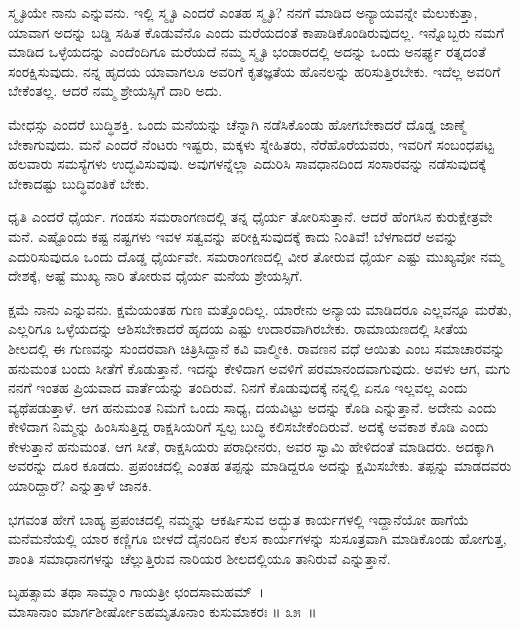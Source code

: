 ಸ್ಮೃತಿಯೇ ನಾನು ಎನ್ನುವನು. ಇಲ್ಲಿ ಸ್ಮೃತಿ ಎಂದರೆ ಎಂತಹ ಸ್ಮೃತಿ? ನನಗೆ ಮಾಡಿದ ಅನ್ಯಾಯವನ್ನೇ ಮೆಲುಕುತ್ತಾ, ಯಾವಾಗ ಅದನ್ನು ಬಡ್ಡಿ ಸಹಿತ ಕೊಡುವೆನೊ ಎಂದು ಮರೆಯದಂತೆ ಕಾಪಾಡಿಕೊಂಡಿರುವುದಲ್ಲ. ಇನ್ನೊಬ್ಬರು ನಮಗೆ ಮಾಡಿದ ಒಳ್ಳೆಯದನ್ನು ಎಂದೆಂದಿಗೂ ಮರೆಯದೆ ನಮ್ಮ ಸ್ಮೃತಿ ಭಂಡಾರದಲ್ಲಿ ಅದನ್ನು ಒಂದು ಅನರ್ಘ್ಯ ರತ್ನದಂತೆ ಸಂರಕ್ಷಿಸುವುದು. ನನ್ನ ಹೃದಯ ಯಾವಾಗಲೂ ಅವರಿಗೆ ಕೃತಜ್ಞತೆಯ ಹೊನಲನ್ನು ಹರಿಸುತ್ತಿರಬೇಕು. ಇದೆಲ್ಲ ಅವರಿಗೆ ಬೇಕೆಂತಲ್ಲ. ಆದರೆ ನಮ್ಮ ಶ್ರೇಯಸ್ಸಿಗೆ ದಾರಿ ಅದು.

ಮೇಧಸ್ಸು ಎಂದರೆ ಬುದ್ಧಿಶಕ್ತಿ. ಒಂದು ಮನೆಯನ್ನು ಚೆನ್ನಾಗಿ ನಡೆಸಿಕೊಂಡು ಹೋಗ\-ಬೇಕಾದರೆ ದೊಡ್ಡ ಜಾಣ್ಮೆ ಬೇಕಾಗುವುದು. ಮನೆ ಎಂದರೆ ನೆಂಟರು ಇಷ್ಟರು, ಮಕ್ಕಳು ಸ್ನೇಹಿತರು, ನೆರೆಹೊರೆಯವರು, ಇವರಿಗೆ ಸಂಬಂಧಪಟ್ಟ ಹಲವಾರು ಸಮಸ್ಯೆಗಳು ಉದ್ಭವಿಸುವುವು. ಅವು\-ಗಳನ್ನೆಲ್ಲಾ ಎದುರಿಸಿ ಸಾವಧಾನದಿಂದ ಸಂಸಾರವನ್ನು ನಡೆಸುವುದಕ್ಕೆ ಬೇಕಾದಷ್ಟು ಬುದ್ಧಿವಂತಿಕೆ ಬೇಕು.

\newpage

ಧೃತಿ ಎಂದರೆ ಧೈರ್ಯ. ಗಂಡಸು ಸಮರಾಂಗಣದಲ್ಲಿ ತನ್ನ ಧೈರ್ಯ ತೋರಿಸುತ್ತಾನೆ. ಆದರೆ ಹೆಂಗಸಿನ ಕುರುಕ್ಷೇತ್ರವೇ ಮನೆ. ಎಷ್ಟೊಂದು ಕಷ್ಟ ನಷ್ಟಗಳು ಇವಳ ಸತ್ವವನ್ನು ಪರೀಕ್ಷಿಸುವುದಕ್ಕೆ ಕಾದು ನಿಂತಿವೆ! ಬೆಳಗಾದರೆ ಅವನ್ನು ಎದುರಿಸುವುದೂ ಒಂದು ದೊಡ್ಡ ಧೈರ್ಯವೇ. ಸಮರಾಂಗಣದಲ್ಲಿ ವೀರ ತೋರುವ ಧೈರ್ಯ ಎಷ್ಟು ಮುಖ್ಯವೋ ನಮ್ಮ ದೇಶಕ್ಕೆ, ಅಷ್ಟೆ ಮುಖ್ಯ ನಾರಿ ತೋರುವ ಧೈರ್ಯ ಮನೆಯ ಶ್ರೇಯಸ್ಸಿಗೆ. 

ಕ್ಷಮೆ ನಾನು ಎನ್ನುವನು. ಕ್ಷಮೆಯಂತಹ ಗುಣ ಮತ್ತೊಂದಿಲ್ಲ. ಯಾರೇನು ಅನ್ಯಾಯ ಮಾಡಿದರೂ ಎಲ್ಲವನ್ನೂ ಮರೆತು, ಎಲ್ಲರಿಗೂ ಒಳ್ಳೆಯದನ್ನು ಆಶಿಸಬೇಕಾದರೆ ಹೃದಯ ಎಷ್ಟು ಉದಾರವಾಗಿರಬೇಕು. ರಾಮಾಯಣದಲ್ಲಿ ಸೀತೆಯ ಶೀಲದಲ್ಲಿ ಈ ಗುಣವನ್ನು ಸುಂದರವಾಗಿ ಚಿತ್ರಿಸಿದ್ದಾನೆ ಕವಿ ವಾಲ್ಮೀಕಿ. ರಾವಣನ ವಧೆ ಆಯಿತು ಎಂಬ ಸಮಾಚಾರವನ್ನು ಹನುಮಂತ ಬಂದು ಸೀತೆಗೆ ಕೊಡುತ್ತಾನೆ. ಇದನ್ನು ಕೇಳಿದಾಗ ಅವಳಿಗೆ ಪರಮಾನಂದವಾಗುವುದು. ಅವಳು ಆಗ, ಮಗು ನನಗೆ ಇಂತಹ ಪ್ರಿಯವಾದ ವಾರ್ತೆಯನ್ನು ತಂದಿರುವೆ. ನಿನಗೆ ಕೊಡುವುದಕ್ಕೆ ನನ್ನಲ್ಲಿ ಏನೂ ಇಲ್ಲವಲ್ಲ ಎಂದು ವ್ಯಥೆಪಡುತ್ತಾಳೆ. ಆಗ ಹನುಮಂತ ನಿಮಗೆ ಒಂದು ಸಾಧ್ಯ, ದಯವಿಟ್ಟು ಅದನ್ನು ಕೊಡಿ ಎನ್ನುತ್ತಾನೆ. ಅದೇನು ಎಂದು ಕೇಳಿದಾಗ ನಿಮ್ಮನ್ನು ಹಿಂಸಿಸುತ್ತಿದ್ದ ರಾಕ್ಷಸಿಯರಿಗೆ ಸ್ವಲ್ಪ ಬುದ್ಧಿ ಕಲಿಸಬೇಕೆಂದಿರುವೆ. ಅದಕ್ಕೆ ಅವಕಾಶ ಕೊಡಿ ಎಂದು ಕೇಳುತ್ತಾನೆ ಹನುಮಂತ. ಆಗ ಸೀತೆ, ರಾಕ್ಷಸಿಯರು ಪರಾಧೀನರು, ಅವರ ಸ್ವಾಮಿ ಹೇಳಿದಂತೆ ಮಾಡಿದರು. ಅದಕ್ಕಾಗಿ ಅವರನ್ನು ದೂರ ಕೂಡದು. ಪ್ರಪಂಚದಲ್ಲಿ ಎಂತಹ ತಪ್ಪನ್ನು ಮಾಡಿದ್ದರೂ ಅದನ್ನು ಕ್ಷಮಿಸಬೇಕು. ತಪ್ಪನ್ನು ಮಾಡದವರು ಯಾರಿದ್ದಾರೆ? ಎನ್ನುತ್ತಾಳೆ ಜಾನಕಿ.

ಭಗವಂತ ಹೇಗೆ ಬಾಹ್ಯ ಪ್ರಪಂಚದಲ್ಲಿ ನಮ್ಮನ್ನು ಆಕರ್ಷಿಸುವ ಅದ್ಭುತ ಕಾರ್ಯಗಳಲ್ಲಿ ಇದ್ದಾನೆಯೋ ಹಾಗೆಯೆ ಮನೆಮನೆಯಲ್ಲಿ ಯಾರ ಕಣ್ಣಿಗೂ ಬೀಳದೆ ದೈನಂದಿನ ಕೆಲಸ ಕಾರ್ಯಗಳನ್ನು ಸುಸೂತ್ರವಾಗಿ ಮಾಡಿಕೊಂಡು ಹೋಗುತ್ತ, ಶಾಂತಿ ಸಮಾಧಾನಗಳನ್ನು ಚೆಲ್ಲುತ್ತಿರುವ ನಾರಿಯರ ಶೀಲದಲ್ಲಿಯೂ ತಾನಿರುವೆ ಎನ್ನುತ್ತಾನೆ.

\begin{shloka}
ಬೃಹತ್ಸಾಮ ತಥಾ ಸಾಮ್ನಾಂ ಗಾಯತ್ರೀ ಛಂದಸಾಮಹಮ್~।\\ಮಾಸಾನಾಂ ಮಾರ್ಗಶೀರ್ಷೋಽಹಮೃತೂನಾಂ ಕುಸುಮಾಕರಃ \hfill॥ ೩೫~॥
\end{shloka}

